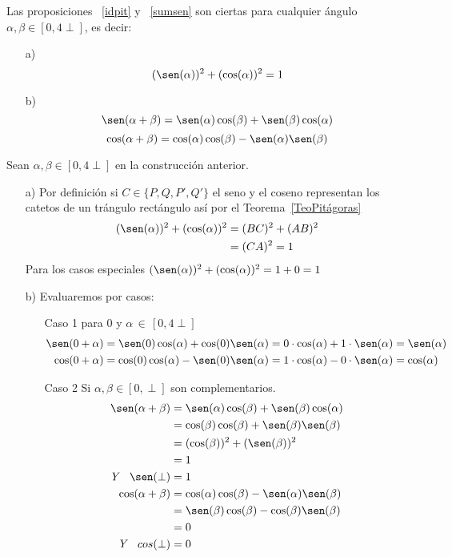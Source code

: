 \begin{prop}\label{sumsencoscom}Las proposiciones ~\ref{idpit} y ~\ref{sumsen} son ciertas para cualquier ángulo $\alpha, \beta \in [0,4\perp]$, es decir:
\end{prop}
\begin{enumerate}
\item[a)] \[ (\sen(\alpha))^2 + (\cos(\alpha))^2 = 1 \]
\item[b)] \[ \sen(\alpha + \beta) = \sen(\alpha)\cos(\beta) + \sen(\beta)\cos(\alpha) \]
          \[ \cos(\alpha + \beta) = \cos(\alpha)\cos(\beta) - \sen(\alpha)\sen(\beta) \]
\end{enumerate}
\begin{pba}Sean $\alpha, \beta \in [0,4\perp]$ en la construcción anterior. 

\begin{enumerate}
\item[a)]Por definición si $C \in \{P,Q,P',Q'\}$ el seno y el coseno representan los catetos de un trángulo rectángulo así por el Teorema~\ref{TeoPitágoras}
\begin{align*}
(\sen(\alpha))^2+(\cos(\alpha))^2 &= (BC)^2 + (AB)^2 \\
&= (CA)^2 =1
\end{align*}
Para los casos especiales $(\sen(\alpha))^2+(\cos(\alpha))^2 = 1 + 0 = 1$
\item[b)] Evaluaremos por casos:
\begin{enumerate}
\item[Caso 1] para $0$ y $\alpha\,\in\,[0,4\perp]$
\begin{align*}
\sen(0+\alpha)&=\sen(0)\cos(\alpha) + \cos(0)\sen(\alpha)= 0\cdot\cos(\alpha) + 1\cdot\sen(\alpha)= \sen(\alpha)\\
\cos(0+\alpha)&=\cos(0)\cos(\alpha) - \sen(0)\sen(\alpha)= 1\cdot\cos(\alpha) - 0\cdot\sen(\alpha)= \cos(\alpha)
\end{align*}
\item[Caso 2] Si $\alpha, \beta \in [0,\perp]$ son complementarios.
\begin{align*}
\sen(\alpha + \beta) 
&= \sen(\alpha)\cos(\beta) + \sen(\beta)\cos(\alpha)\\
&= \cos(\beta)\cos(\beta) + \sen(\beta)\sen(\beta)\\
&= (\cos(\beta))^2 + (\sen(\beta))^2\\
&= 1\\
\textit{Y}  \quad
\sen(\perp) &= 1\\                   
\cos(\alpha + \beta) 
&= \cos(\alpha)\cos(\beta) - \sen(\alpha)\sen(\beta) \\
&= \sen(\beta)\cos(\beta) - \cos(\beta)\sen(\beta)\\
&= 0\\
\textit{Y}   \quad        
cos(\perp)&= 0\\
\end{align*}


\end{enumerate}
\end{enumerate}
\end{pba}
